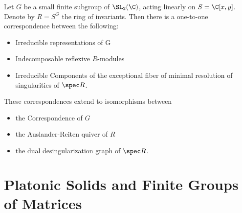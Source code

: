 \begin{thm}
Let $G$ be a small finite subgroup of $\SL_2(\C)$, acting linearly on $S= \C[x,y]$. Denote by $R=S^G$ the ring of invariants. Then there is a one-to-one correspondence between the following:
	\begin{itemize}
	\item Irreducible representations of G
	\item Indecomposable reflexive $R$-modules
	\item Irreducible Components of the exceptional fiber of minimal resolution of singularities of $\spec R$.
	\end{itemize}
These correspondences extend to isomorphisms between 
	\begin{itemize}
	\item the \mc Correspondence of $G$
	\item the Auslander-Reiten quiver of $R$
	\item the dual desingularization graph of $\spec R$. 
	\end{itemize}
\end{thm}



















\newpage
\section{Platonic Solids and Finite Groups of Matrices}


